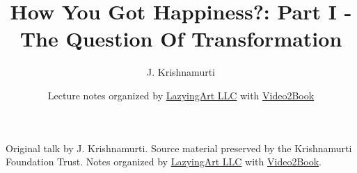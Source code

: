 \documentclass[11pt,oneside]{book}
\begin{document}
\frontmatter
\title{How You Got Happiness?: Part I - The Question Of Transformation}
\author{J. Krishnamurti}
\date{Lecture notes organized by \href{https://lazying.art}{LazyingArt LLC} with \href{https://github.com/lachlanchen/Video2Book}{Video2Book}}
\maketitle
\begin{center}
\small Original talk by J. Krishnamurti. Source material preserved by the Krishnamurti Foundation Trust. Notes organized by \href{https://lazying.art}{LazyingArt LLC} with \href{https://github.com/lachlanchen/Video2Book}{Video2Book}.
\end{center}
\clearpage
\mainmatter

\end{document}
